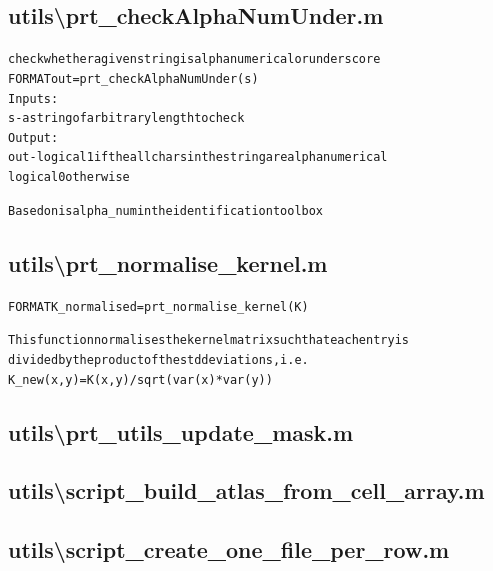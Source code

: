 \subsection{utils\textbackslash prt\_checkAlphaNumUnder.m}
\begin{alltt}

 check whether a given string is alphanumerical or underscore
 FORMAT out =  prt\_checkAlphaNumUnder(s)
 Inputs:
   s - a string of arbitrary length to check
 Output:
   out - logical 1 if the all chars in the string are alphanumerical
         logical 0 otherwise
 
 Based on isalpha\_num in the identification toolbox
\end{alltt}


\subsection{utils\textbackslash prt\_normalise\_kernel.m}
\begin{alltt}

 FORMAT K\_normalised = prt\_normalise\_kernel(K)
 
 This function normalises the kernel matrix such that each entry is 
 divided by the product of the std deviations, i.e.
 K\_new(x,y) = K(x,y) / sqrt(var(x)*var(y)) 
\end{alltt}


\subsection{utils\textbackslash prt\_utils\_update\_mask.m}
\begin{alltt}

\end{alltt}


\subsection{utils\textbackslash script\_build\_atlas\_from\_cell\_array.m}
\begin{alltt}

\end{alltt}


\subsection{utils\textbackslash script\_create\_one\_file\_per\_row.m}
\begin{alltt}

\end{alltt}


